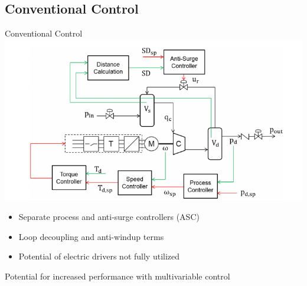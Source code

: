 \subsection{Conventional Control}
\begin{frame}{Conventional Control}
  \centering
  \includegraphics[width=0.7\linewidth]{intro/diagram.png}
  \begin{itemize}
    \item Separate process and anti-surge controllers (ASC)
    \item Loop decoupling and anti-windup terms
    \item Potential of electric drivers not fully utilized
  \end{itemize}
  \alert{Potential for increased performance with multivariable control}
\end{frame}


